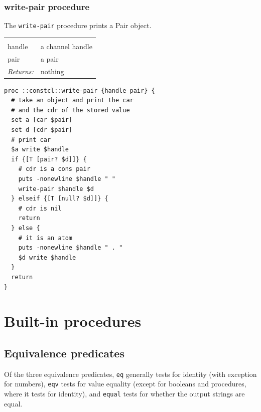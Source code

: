 \documentclass[twoside,9pt]{report}
\begin{document}
\subsection{write-pair procedure}
\label{write-pair-procedure}


The \texttt{write-pair} procedure prints a Pair object.

\noindent\begin{tabular}{ |p{1.9cm} p{8cm}| }
\hline
\rowcolor[HTML]{CCCCCC} \multicolumn{2}{|l|}{\bf write-pair (internal)} \\
handle & a channel handle \\
pair & a pair \\
\textit{Returns:} & nothing \\
\hline
\end{tabular}
\begin{lstlisting}
proc ::constcl::write-pair {handle pair} {
  # take an object and print the car
  # and the cdr of the stored value
  set a [car $pair]
  set d [cdr $pair]
  # print car
  $a write $handle
  if {[T [pair? $d]]} {
    # cdr is a cons pair
    puts -nonewline $handle " "
    write-pair $handle $d
  } elseif {[T [null? $d]]} {
    # cdr is nil
    return
  } else {
    # it is an atom
    puts -nonewline $handle " . "
    $d write $handle
  }
  return
}
\end{lstlisting}
\chapter{Built-in procedures}
\label{built-in-procedures}
\section{Equivalence predicates}
\label{equivalence-predicates}


Of the three equivalence predicates, \texttt{eq} generally tests for identity (with exception for numbers), \texttt{eqv} tests for value equality (except for booleans and procedures, where it tests for identity), and \texttt{equal} tests for whether the output strings are equal.
\end{document}
